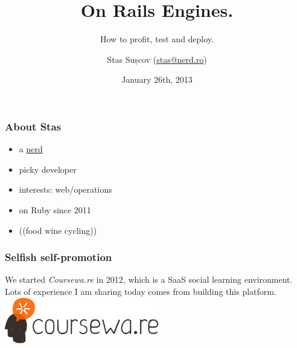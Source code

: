 \documentclass[compress]{beamer}
\title{On Rails Engines.}
\subtitle{How to profit, test and deploy.}
\author{Stas Sușcov (\href{mailto:stas@nerd.ro}{stas@nerd.ro})}
\date{January 26th, 2013}
\institute{GeekMeet \#14, Cluj-Napoca, Transylvania}
\begin{document}
\maketitle

\begin{frame}
\frametitle{About Stas}

\begin{itemize}[<+->]
  \item a \href{http://stas.nerd.ro}{nerd}
  \item picky developer
  \item interests: web/operations
  \item on Ruby since 2011
  \item (\Heart (food wine cycling))
\end{itemize}
\end{frame}

\begin{frame}
\frametitle{Selfish self-promotion}
  \begin{center}
    \huge We started \emph{Coursewa.re} in 2012, which is a SaaS social learning environment.
    \\
    \small Lots of experience I am sharing today comes from building this platform.
    \colorbox{solarizedBase3}{\includegraphics[height=2cm]{courseware.png}}
  \end{center}
\end{frame}
\end{document}
